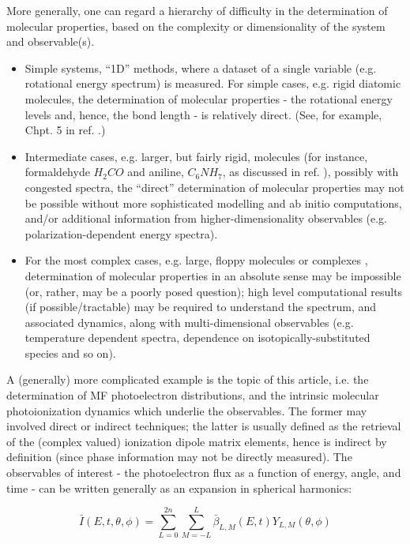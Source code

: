 
More generally, one can regard a hierarchy of difficulty in the determination of molecular properties, based on the complexity or dimensionality of the system and observable(s).
\begin{itemize}
\item Simple systems, ``1D” methods, where a dataset of a single variable (e.g. rotational energy spectrum) is measured. For simple cases, e.g. rigid diatomic molecules, the determination of molecular properties - the rotational energy levels and, hence, the bond length - is relatively direct. (See, for example, Chpt. 5 in ref. \cite{hollasHighRes}.) %
\item Intermediate cases, e.g. larger, but fairly rigid, molecules (for instance, formaldehyde $H_2CO$ and aniline, $C_6NH_7$, as discussed in ref. \cite{hollasHighRes}), possibly with congested spectra, the ``direct” determination of molecular properties may not be possible without more sophisticated modelling and ab initio computations, and/or additional information from higher-dimensionality observables (e.g. polarization-dependent energy spectra).
\item For the most complex cases, e.g. large, floppy molecules or complexes \cite{bunkerMolSymm,schmiedt2015SymmetryExtremelyFloppy}, determination of molecular properties in an absolute sense may be impossible (or, rather, may be a poorly posed question); high level computational results (if possible/tractable) may be required to understand the spectrum, and associated dynamics, along with multi-dimensional observables (e.g. temperature dependent spectra, dependence on isotopically-substituted species and so on).
\end{itemize}    

A (generally) more complicated example is the topic of this article, i.e. the determination of MF photoelectron distributions, and the intrinsic molecular photoionization dynamics which underlie the observables.  The former may involved direct or indirect techniques; the latter is usually defined as the retrieval of the (complex valued) ionization dipole matrix elements, hence is indirect by definition (since phase information may not be directly measured). The observables of interest - the photoelectron flux as a function of energy, angle, and time - can be written generally as an expansion in spherical harmonics:

\begin{equation}
\bar{I}(E,t,\theta,\phi)=\sum_{L=0}^{2n}\sum_{M=-L}^{L}\bar{\beta}_{L,M}(E,t)Y_{L,M}(\theta,\phi)\label{eq:AF-PAD-general}
\end{equation}

